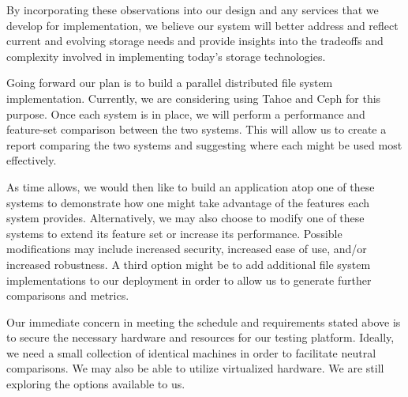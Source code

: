 \documentclass[11pt]{article}
\begin{document}
By incorporating these observations into our design and any
services that we develop for implementation, we believe our
system will better address and reflect current and evolving
storage needs and provide insights into the tradeoffs and 
complexity involved in implementing today's storage technologies.

Going forward our plan is to build a parallel distributed file 
system implementation. Currently, we are considering using 
Tahoe and Ceph for this purpose. Once each system is in place, 
we will perform a performance and feature-set comparison between 
the two systems. This will allow us to create a report comparing 
the two systems and suggesting where each might be used most 
effectively.

As time allows, we would then like to build an application atop one
of these systems to demonstrate how one might take advantage of the
features each system provides. Alternatively, we may also choose to
modify one of these systems to extend its feature set or increase
its performance. Possible modifications may include increased 
security, increased ease of use, and/or increased robustness.
A third option might be to add additional file system implementations 
to our deployment in order to allow us to generate further comparisons 
and metrics.

Our immediate concern in meeting the schedule and requirements stated 
above is to secure the necessary hardware and resources for our 
testing platform. Ideally, we need a small collection of identical 
machines in order to facilitate neutral comparisons. We may also be 
able to utilize virtualized hardware. We are still exploring the options 
available to us.

\nocite{*}

\end{document}
